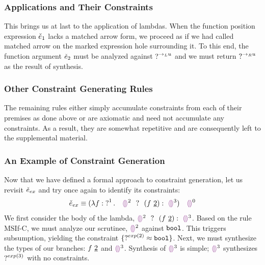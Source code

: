 \subsubsection{Applications and Their Constraints}
This brings us at last to the application of lambdas. When the function position expression $\ECMV_1$ lacks a matched arrow form, we proceed as if we had called matched arrow on the marked expression hole surrounding it. To this end, the function argument $\ECMV_2$ must be analyzed against $\TUnknown^{\rightarrow_L{u}}$ and we must return $\TUnknown^{\rightarrow_R{u}}$ as the result of synthesis. 
\begin{mathpar}
\end{mathpar}

\subsubsection{Other Constraint Generating Rules}
The remaining rules either simply accumulate constraints from each of their premises as done above or are axiomatic and need not accumulate any constraints. As a result, they are somewhat repetitive and are consequently left to the supplemental material.

\subsubsection{An Example of Constraint Generation}
Now that we have defined a formal approach to constraint generation, let us revisit $\ECMV_{ex}$ and try once again to identify its constraints:
$$\ECMV_{ex} \equiv \ECAp{(\ECLam{f}{\TUnknown^1}{~~\ECIf{\EEHole^2~}{~(\ECAp{f}{\underline{2}})}{~\EEHole^3}})}{~~\EEHole^0}$$
We first consider the body of the lambda, $\ECIf{\EEHole^2~}{~(\ECAp{f}{\underline{2}})}{~\EEHole^3}$. Based on the rule MSIf-C, we must analyze our scrutinee, $\EEHole^2$ against $\tbool$. This triggers subsumption, yielding the constraint $\{ \TUnknown^{exp(2)} \approx \tbool \}$. Next, we must synthesize the types of our branches: $\ECAp{f}{\underline{2}}$ and $\EEHole^3$. Synthesis of $\EEHole^3$ is simple; $\EEHole^3$ synthesizes $\TUnknown^{exp(3)}$ with no constraints.

